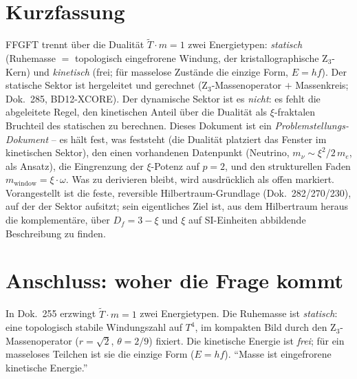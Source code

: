
\section*{Kurzfassung}
FFGFT trennt über die Dualität $\tilde T\cdot m=1$ zwei Energietypen: \emph{statisch} (Ruhemasse
$=$ topologisch eingefrorene Windung, der kristallographische Z$_3$-Kern) und \emph{kinetisch}
(frei; für masselose Zustände die einzige Form, $E=hf$). Der statische Sektor ist hergeleitet und
gerechnet (Z$_3$-Massenoperator $+$ Massenkreis; Dok.~285, BD12-XCORE). Der dynamische Sektor ist
es \emph{nicht}: es fehlt die abgeleitete Regel, den kinetischen Anteil über die Dualität als
$\xi$-fraktalen Bruchteil des statischen zu berechnen. Dieses Dokument ist ein
\emph{Problemstellungs-Dokument} -- es hält fest, was feststeht (die Dualität platziert das Fenster
im kinetischen Sektor), den einen vorhandenen Datenpunkt (Neutrino, $m_\nu\sim\xi^2/2\,m_e$, als
Ansatz), die Eingrenzung der $\xi$-Potenz auf $p=2$, und den strukturellen Faden
$m_{\text{window}}=\xi\cdot\omega$. Was zu derivieren bleibt, wird ausdrücklich als offen markiert. Vorangestellt ist die feste, reversible Hilbertraum-Grundlage (Dok.~282/270/230), auf der der Sektor aufsitzt; sein eigentliches Ziel ist, aus dem Hilbertraum heraus die komplementäre, über $D_f=3-\xi$ und $\xi$ auf SI-Einheiten abbildende Beschreibung zu finden.

\section{Anschluss: woher die Frage kommt}
In Dok.~255 erzwingt $\tilde T\cdot m=1$ zwei Energietypen. Die Ruhemasse ist \emph{statisch}:
eine topologisch stabile Windungszahl auf $T^4$, im kompakten Bild durch den Z$_3$-Massenoperator
($r=\sqrt2$, $\theta=2/9$) fixiert. Die kinetische Energie ist \emph{frei}; für ein masseloses
Teilchen ist sie die einzige Form ($E=hf$). \enquote{Masse ist eingefrorene kinetische Energie.}

